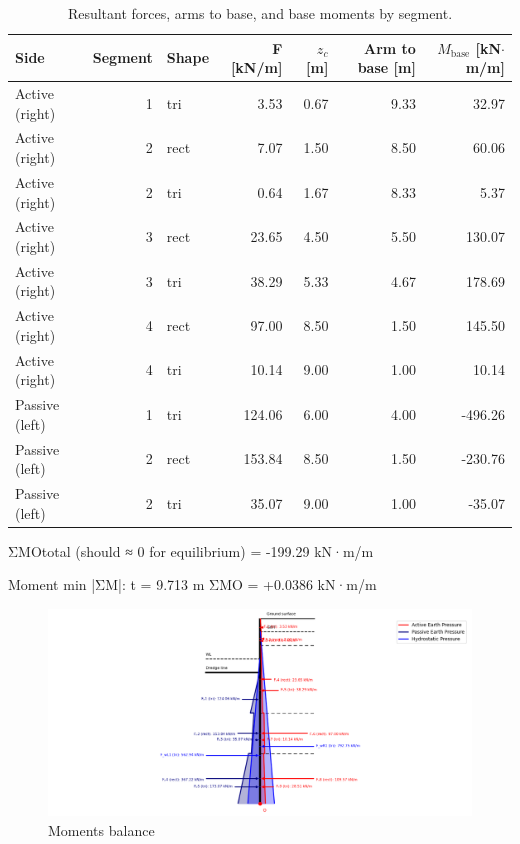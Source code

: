 \begin{table}[ht]
  \centering
  \caption{Resultant forces, arms to base, and base moments by segment.}
  \label{tab:forces_arms_moments_now}
  \small
  \setlength{\tabcolsep}{8pt}
  \renewcommand{\arraystretch}{1.15}
  \begin{tabular}{@{}l r l r r r r@{}}
    \toprule
    \textbf{Side} & \textbf{Segment} & \textbf{Shape} &
    \textbf{F [kN/m]} & \textbf{$z_c$ [m]} & \textbf{Arm to base [m]} &
    \textbf{$M_{\text{base}}$ [kN$\cdot$m/m]} \\
    \midrule
    Active (right) & 1 & tri  &  3.53  & 0.67 & 9.33 &  32.97 \\
    Active (right) & 2 & rect &  7.07  & 1.50 & 8.50 &  60.06 \\
    Active (right) & 2 & tri  &  0.64  & 1.67 & 8.33 &   5.37 \\
    Active (right) & 3 & rect & 23.65  & 4.50 & 5.50 & 130.07 \\
    Active (right) & 3 & tri  & 38.29  & 5.33 & 4.67 & 178.69 \\
    Active (right) & 4 & rect & 97.00  & 8.50 & 1.50 & 145.50 \\
    Active (right) & 4 & tri  & 10.14  & 9.00 & 1.00 &  10.14 \\
    Passive (left) & 1 & tri  & 124.06 & 6.00 & 4.00 & -496.26 \\
    Passive (left) & 2 & rect & 153.84 & 8.50 & 1.50 & -230.76 \\
    Passive (left) & 2 & tri  &  35.07 & 9.00 & 1.00 &  -35.07 \\
    \bottomrule
  \end{tabular}
\end{table}

ΣMOtotal (should ≈ 0 for equilibrium) =  -199.29 kN·m/m



Moment min |ΣM|: t = 9.713 m
ΣMO = +0.0386 kN·m/m

\begin{figure}[H]
    \centering
    \includegraphics[width=0.70\linewidth]{figures/ch8/moments_balance.png}
    \caption{Moments balance}
    \label{fig:moments_balance}
\end{figure}

